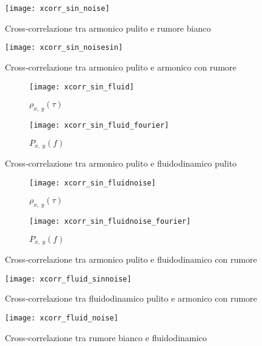 \documentclass{article} %
\begin{document}
\begin{figure}[h!]
	\begin{minipage}[t]{0.5\textwidth}
		\texttt{[image: xcorr\_sin\_noise]}
		\caption{Cross-correlazione tra armonico pulito e rumore bianco}
		\label{fig:xcorr_sin_noise}
	\end{minipage}
	\begin{minipage}[t]{0.5\textwidth}
		\texttt{[image: xcorr\_sin\_noisesin]}
		\caption{Cross-correlazione tra armonico pulito e armonico con rumore}
		\label{fig:xcorr_sin_noisesin}
	\end{minipage}
\end{figure}
\begin{figure}[h!]
	\begin{subfigure}{0.5\textwidth}
		\texttt{[image: xcorr\_sin\_fluid]}
		\caption{$\rho_{x,\ y}(\tau)$}
	\end{subfigure}
	\begin{subfigure}{0.5\textwidth}
		\texttt{[image: xcorr\_sin\_fluid\_fourier]}
		\caption{$P_{x,\ y}(f)$}
	\end{subfigure}
	\caption{Cross-correlazione tra armonico pulito e fluidodinamico pulito}
	\label{fig:xcorr_sin_fluid}
\end{figure}
\begin{figure}[h!]
	\begin{subfigure}{0.5\textwidth}
		\texttt{[image: xcorr\_sin\_fluidnoise]}
		\caption{$\rho_{x,\ y}(\tau)$}
	\end{subfigure}
	\begin{subfigure}{0.5\textwidth}
		\texttt{[image: xcorr\_sin\_fluidnoise\_fourier]}
		\caption{$P_{x,\ y}(f)$}
	\end{subfigure}
	\caption{Cross-correlazione tra armonico pulito e fluidodinamico con rumore}
	\label{fig:xcorr_sin_fluidnoise}
\end{figure}
\begin{figure}[h!]
	\begin{minipage}{0.5\textwidth}
		\texttt{[image: xcorr\_fluid\_sinnoise]}
		\caption{Cross-correlazione tra fluidodinamico pulito e armonico con rumore}
		\label{fig:xcorr_fluid_sinnoise}
	\end{minipage}
	\begin{minipage}{0.5\textwidth}
		\texttt{[image: xcorr\_fluid\_noise]}
		\caption{Cross-correlazione tra rumore bianco e fluidodinamico}
		\label{fig:xcorr_fluid_noise}
	\end{minipage}
\end{figure}
\end{document}
